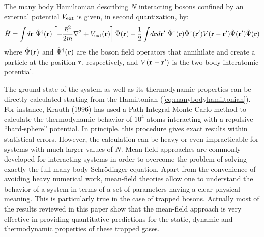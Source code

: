 The many body Hamiltonian describing  $N$ interacting bosons confined by
an external potential $V_{\rm ext}$ is given, in  second quantization, by:
\begin{equation}
\hat{H}  =  \int \! d{\bf r}  \ \hat\Psi^{\dagger} ({\bf r})
\left[ - {\hbar^2 \over 2m} \nabla^2 + V_{\rm ext}({\bf r}) \right]
\hat\Psi ({\bf r})
 +  {1\over 2} \int \! d{\bf r}d{\bf r}' \
\hat\Psi^{\dagger} ({\bf r}) \hat\Psi^{\dagger} ({\bf r}')
V({\bf r} - {\bf r}')
\hat{\Psi} ({\bf r}') \hat{\Psi} ({\bf r})
\label{eq:manybodyhamiltonian}
\end{equation}
where $\hat{\Psi}({\bf r})$ and $\hat\Psi^{\dagger}({\bf r})$ are
the boson field operators that annihilate and create a particle
at the position ${\bf r}$, respectively, and $V({\bf r} - {\bf r}')$
is the two-body interatomic potential.

The ground state of the system as well as its thermodynamic properties
can be directly calculated starting from the Hamiltonian
(\ref{eq:manybodyhamiltonian}). For instance, Krauth (1996) has 
used a Path Integral Monte Carlo method to calculate the thermodynamic
behavior of  $10^4$ atoms interacting with a repulsive ``hard-sphere''
potential. In principle, this procedure gives exact results within
statistical errors. However, the calculation can be heavy or even
impracticable for systems with much  larger values of  $N$.
Mean-field approaches are commonly developed for interacting
systems in order to overcome the problem of solving
exactly the full many-body Schr\"odinger equation. Apart from
the convenience of avoiding heavy numerical work, mean-field
theories  allow one to understand the behavior of a system in terms
of a set of parameters having a clear physical meaning.  This is
particularly true in the case of trapped bosons. Actually most
of the results reviewed in this paper show that the mean-field
approach is very effective in providing quantitative predictions
for the  static, dynamic and thermodynamic properties of these
trapped gases.

